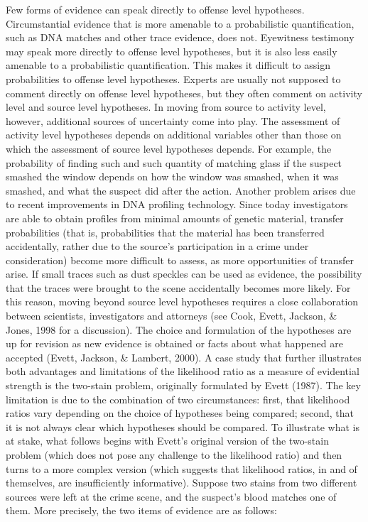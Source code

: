 \documentclass[
  10pt,
  dvipsnames,enabledeprecatedfontcommands]{scrartcl}
\newcommand{\mar}[1]{\todo[color=blue!40]{#1}}
\begin{document}
Few forms of evidence can speak directly to offense level hypotheses.
Circumstantial evidence that is more amenable to a probabilistic
quantification, such as DNA matches and other trace evidence, does not.
Eyewitness testimony may speak more directly to offense level
hypotheses, but it is also less easily amenable to a probabilistic
quantification. This makes it difficult to assign probabilities to
offense level hypotheses. Experts are usually not supposed to comment
directly on offense level hypotheses, but they often comment on activity
level and source level hypotheses. In moving from source to activity
level, however, additional sources of uncertainty come into play. The
assessment of activity level hypotheses depends on additional variables
other than those on which the assessment of source level hypotheses
depends. For example, the probability of finding such and such quantity
of matching glass if the suspect smashed the window depends on how the
window was smashed, when it was smashed, and what the suspect did after
the action. Another problem arises due to recent improvements in DNA
profiling technology.\mar{R: clarified transfer probabilities} Since
today investigators are able to obtain profiles from minimal amounts of
genetic material, transfer probabilities (that is, probabilities that
the material has been transferred accidentally, rather due to the
source's participation in a crime under consideration) become more
difficult to assess, as more opportunities of transfer arise. If small
traces such as dust speckles can be used as evidence, the possibility
that the traces were brought to the scene accidentally becomes more
likely. For this reason, moving beyond source level hypotheses requires
a close collaboration between scientists, investigators and attorneys
(see Cook, Evett, Jackson, \& Jones, 1998 for a discussion). The choice
and formulation of the hypotheses are up for revision as new evidence is
obtained or facts about what happened are accepted (Evett, Jackson, \&
Lambert, 2000). A case study that further illustrates both advantages
and limitations of the likelihood ratio as a measure of evidential
strength is the two-stain problem, originally formulated by Evett
(1987). The key limitation is due to the combination of two
circumstances: first, that likelihood ratios vary depending on the
choice of hypotheses being compared; second, that it is not always clear
which hypotheses should be compared. To illustrate what is at stake,
what follows begins with Evett's original version of the two-stain
problem (which does not pose any challenge to the likelihood ratio) and
then turns to a more complex version (which suggests that likelihood
ratios, in and of themselves, are insufficiently informative). Suppose
two stains from two different sources were left at the crime scene, and
the suspect's blood matches one of them. More precisely, the two items
of evidence are as follows: \vspace{2mm}
\end{document}

